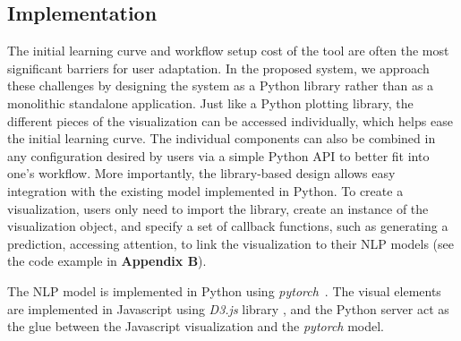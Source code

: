 \subsection{Implementation}
\label{sec:implementation}
The initial learning curve and workflow setup cost of the tool are often the most significant barriers for user adaptation.
In the proposed system, we approach these challenges by designing the system as a Python library rather than as a monolithic standalone application. 
Just like a Python plotting library, the different pieces of the visualization can be accessed individually, which helps ease the initial learning curve. 
The individual components can also be combined in any configuration desired by users via a simple Python API to better fit into one's workflow.
More importantly, the library-based design allows easy integration with the existing model implemented in Python.
%
To create a visualization, users only need to import the library, create an instance of the visualization object, and specify a set of callback functions, such as generating a prediction, accessing attention, to link the visualization to their NLP models (see the code example in \textbf{Appendix B}). 


%
The NLP model is implemented in Python using \emph{pytorch}~\cite{PaszkeGrossChintala2017}.
The visual elements are implemented in Javascript using \emph{D3.js} library , and the Python server act as the glue between the Javascript visualization and the \emph{pytorch} model.
